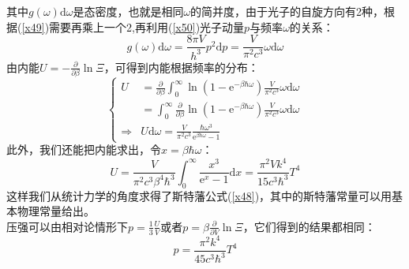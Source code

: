 \documentclass[12pt]{article}
\begin{document}
其中$g(\omega)\mathrm{d}\omega$是态密度，也就是相同$\omega$的简并度，由于光子的自旋方向有2种，根据(\ref{x49})需要再乘上一个2,再利用(\ref{x50})光子动量$p$与频率$\omega$的关系：
\begin{equation}
	g(\omega)\mathrm{d}\omega=\frac{8\pi V}{h^3}p^2\mathrm{d}p=\frac{V}{\pi^2c^3}\omega\mathrm{d}\omega
\end{equation}
由内能$U=-\frac{\partial}{\partial \beta}\ln \Xi$，可得到内能根据频率的分布：
\begin{equation}
	\left \{
	\begin{split}
	U&=\frac{\partial}{\partial\beta}\int_{0}^{\infty} \ln (1-\mathrm{e}^{-\beta\hbar\omega})\frac{V}{\pi^2c^3}\omega\mathrm{d}\omega		\\
	&=\int_{0}^{\infty} \frac{\partial}{\partial\beta}\ln (1-\mathrm{e}^{-\beta\hbar\omega})\frac{V}{\pi^2c^3}\omega\mathrm{d}\omega\\
	\Rightarrow &U\mathrm{d}\omega=\frac{V}{\pi^2 c^3}\frac{\hbar \omega^3}{\mathrm{e}^{\beta\hbar\omega}-1}
\end{split}\right.
\end{equation}
此外，我们还能把内能求出，令$x=\beta\hbar\omega$：
\begin{equation}
	U=\frac{V}{\pi^2 c^3\beta^4\hbar^3}\int_{0}^{\infty} \frac{x^3}{\mathrm{e}^x-1}\mathrm{d}x=\frac{\pi^2Vk^4}{15c^3\hbar^3}T^4
\end{equation}
这样我们从统计力学的角度求得了斯特藩公式(\ref{x48})，其中的斯特藩常量可以用基本物理常量给出。\\
压强可以由相对论情形下$p=\frac{1}{3}\frac{U}{V}$或者$p=\beta\frac{\partial}{\partial V}\ln \Xi$，它们得到的结果都相同：
\begin{equation}
	p=\frac{\pi^2k^4}{45c^3\hbar^3}T^4
\end{equation}
\end{document}
